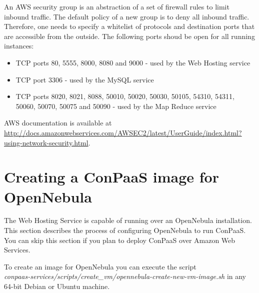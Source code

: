 \documentclass[10pt]{article}
\begin{document}
An AWS security group is an abstraction of a set of firewall rules to
limit inbound traffic. The default policy of a new group is to deny
all inbound traffic. Therefore, one needs to specify a whitelist of
protocols and destination ports that are accessible from the outside. 
The following ports shoud be open for all running instances: 
\begin{itemize}
\item TCP ports 80, 5555, 8000, 8080 and 9000 - used by the Web Hosting service
\item TCP port 3306 - used by the MySQL service
\item TCP ports 8020, 8021, 8088, 50010, 50020, 50030, 50105, 54310, 54311, 50060, 50070, 50075 and 50090 - used by the Map Reduce service 
\end{itemize}

AWS documentation is available at
\url{http://docs.amazonwebservices.com/AWSEC2/latest/UserGuide/index.html?using-network-security.html}.

\section{Creating a ConPaaS image for OpenNebula}
\label{sec:oneimage}

The Web Hosting Service is capable of running over an OpenNebula
installation. This section describes the process of configuring
OpenNebula to run ConPaaS. You can skip this section if you plan to
deploy ConPaaS over Amazon Web Services.

To create an image for OpenNebula you can execute the script\\
\textit{conpaas-services/scripts/create\_vm/opennebula-create-new-vm-image.sh} in any
64-bit Debian or Ubuntu machine.
\end{document}
